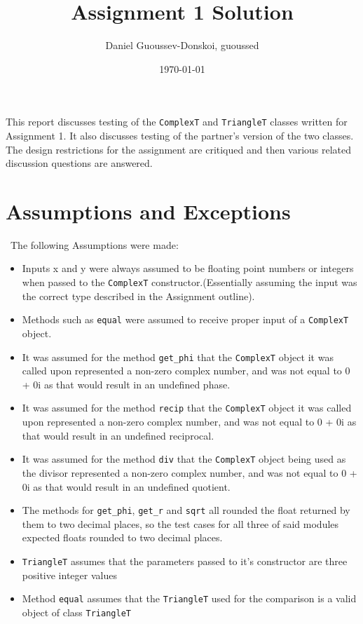 \documentclass[12pt]{article}
\title{Assignment 1 Solution}
\author{Daniel Guoussev-Donskoi, guoussed}
\date{\today}
\begin{document}
\maketitle
This report discusses testing of the \verb|ComplexT| and \verb|TriangleT|
classes written for Assignment 1. It also discusses testing of the partner's
version of the two classes. The design restrictions for the assignment
are critiqued and then various related discussion questions are answered.
\section{Assumptions and Exceptions} \label{AssumptAndExcept}
~\newline\noindent The following Assumptions were made:
\begin{itemize}
\item Inputs x and y were always assumed to be floating point numbers or integers when passed to the \verb|ComplexT| constructor.(Essentially assuming the input was the correct type described in the Assignment outline).
\item Methods such as \verb|equal| were assumed to receive proper input of a \verb|ComplexT| object.
\item It was assumed for the method \verb|get_phi| that the \verb|ComplexT| object it was called upon represented a non-zero complex number, and was not equal to 0 + 0i as that would result in an undefined phase.
\item It was assumed for the method \verb|recip| that the \verb|ComplexT| object it was called upon represented a non-zero complex number, and was not equal to 0 + 0i as that would result in an undefined reciprocal.
\item It was assumed for the method \verb|div| that the \verb|ComplexT| object being used as the divisor represented a non-zero complex number, and was not equal to 0 + 0i as that would result in an undefined quotient.
\item The methods for \verb|get_phi|, \verb|get_r| and \verb|sqrt| all rounded the float returned by them to two decimal places, so the test cases for all three of said modules expected floats rounded to two decimal places.
\item \verb|TriangleT| assumes that the parameters passed to it's constructor are three positive integer values
\item Method \verb|equal| assumes that the \verb|TriangleT| used for the comparison is a valid object of class \verb|TriangleT|
\end{itemize}
\end{document}

